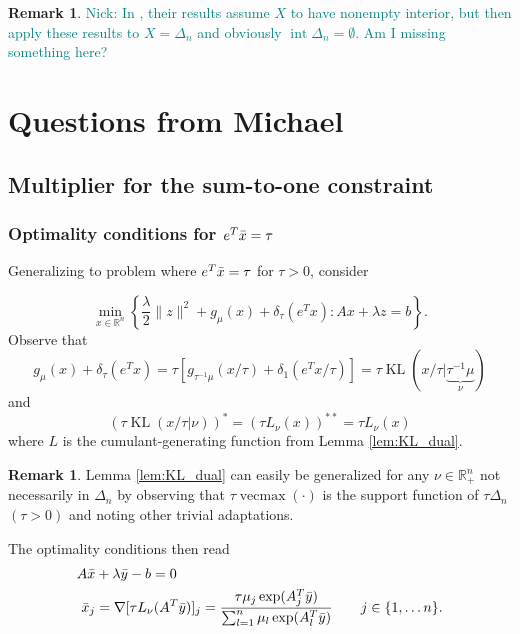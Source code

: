 \documentclass[10pt,a4paper]{article}
\numberwithin{equation}{section}
\theoremstyle{definition}
\newtheorem{remark}[theorem]{Remark}
\def\rr{{\mathbb R}}
\DeclareMathOperator{\vecmax}{vecmax}
\DeclareMathOperator{\interior}{int}
\DeclareMathOperator{\KL}{KL}
\begin{document}
\begin{remark}
    \textcolor{teal}{Nick: In \cite{Beck2003MirrorDA}, their results assume $X$ to have nonempty interior, but then apply these results to $X = \Delta_n$ and obviously $\interior \Delta_n = \emptyset$. Am I missing something here?}
\end{remark}

\section{Questions from Michael}

\subsection{Multiplier for the sum-to-one constraint}

\subsubsection{Optimality conditions for $e^T\Bar{x} = \tau$}

Generalizing to problem where $e^T\Bar{x} = \tau$ for $\tau >0$, consider 

\begin{equation}\label{eq:primal_tau}
    \min_{x \in \rr^n} \left\{ \frac{\lambda}{2} \lVert z \rVert^2 +  g_\mu(x) + \delta_{\tau}(e^Tx) : Ax + \lambda z = b \right\}.
\end{equation}
Observe that
\[
g_\mu(x) + \delta_{\tau}(e^Tx) = \tau [g_{\tau^{-1}\mu}(x/\tau) + \delta_{1}(e^Tx/\tau)] = \tau \KL(x/\tau | \underbrace{\tau^{-1} \mu}_{\nu})
\]
and 
\[
(\tau \KL(x/\tau | \nu) )^\ast = (\tau L_{\nu}(x))^{\ast \ast} = \tau L_{\nu}(x)
\]
where $L$ is the cumulant-generating function from Lemma \ref{lem:KL_dual}.

\begin{remark}
   Lemma \ref{lem:KL_dual} can easily be generalized for any $\nu \in \rr^n_{+}$ not necessarily in $\Delta_n$ by observing that $\tau \vecmax(\cdot)$ is the support function of $\tau \Delta_n$ $(\tau>0)$ and noting other trivial adaptations.
\end{remark}
The optimality conditions then read
\begin{align}
A\Bar{x} &+ \lambda \Bar{y} - b = 0 \label{eq:tau_op1}\\
\Bar{x}_j &= \nabla [\tau L_{\nu}(A^T\Bar{y})]_j = \frac{ \tau \mu_j \exp(A_j^T\Bar{y})}{\sum_{l=1}^n \mu_l \exp(A_l^T\Bar{y})} \qquad j \in \{1, \dots n\}. \label{eq:tau_op2}
\end{align}
\end{document}
